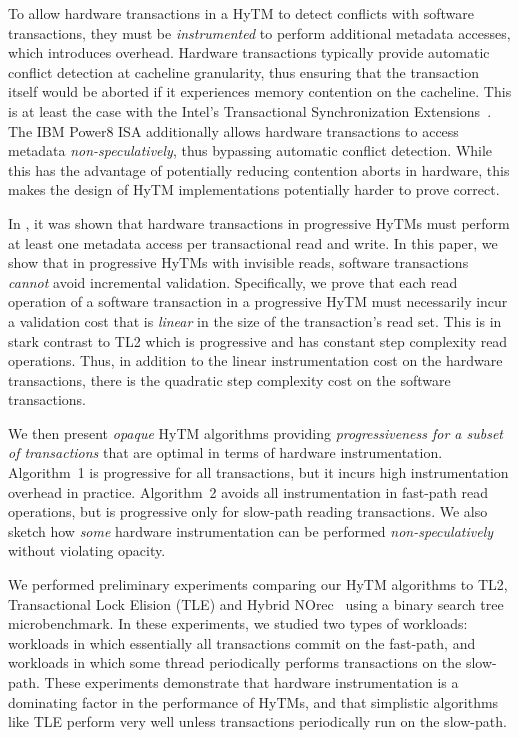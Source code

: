 To allow hardware transactions in a HyTM to detect conflicts with software transactions, they must be \emph{instrumented} to perform additional metadata accesses, which introduces overhead.
Hardware transactions typically provide automatic conflict detection at cacheline granularity,
thus ensuring that the transaction itself would be aborted if it experiences memory contention on the cacheline.
This is at least the case with the Intel's Transactional Synchronization Extensions~\cite{haswell}.
The IBM Power8 ISA additionally allows hardware transactions to access metadata \emph{non-speculatively}, 
thus bypassing automatic conflict detection. While this has the advantage of potentially reducing contention aborts
in hardware, this makes the design of HyTM implementations potentially harder to prove correct.

In \cite{htmdisc15}, it was shown that hardware transactions in progressive HyTMs must perform
at least one metadata access per transactional read and write.
In this paper, we show that in progressive HyTMs with invisible reads, 
software transactions \textit{cannot} avoid incremental validation.
Specifically, we prove that each read operation of a software transaction in a progressive HyTM
must necessarily incur a validation cost that is \emph{linear} 
in the size of the transaction's read set. 
This is in stark contrast to TL2 which is progressive and has constant step complexity read operations.
Thus, in addition to the linear instrumentation cost on the hardware transactions, there is the quadratic
step complexity cost on the software transactions.

We then present \emph{opaque} HyTM algorithms providing \emph{progressiveness for a subset of transactions} that are  %
optimal in terms of hardware instrumentation.
Algorithm~1 is progressive for all transactions, but it incurs high instrumentation overhead in practice.
Algorithm~2 avoids all instrumentation in fast-path read operations, but is progressive only for slow-path reading transactions.
We also sketch how \emph{some} hardware instrumentation can be performed \textit{non-speculatively} without violating opacity.

We performed preliminary experiments comparing our HyTM algorithms to TL2, Transactional Lock Elision (TLE) and Hybrid NOrec~\cite{hynorecriegel} using a binary search tree microbenchmark.
In these experiments, we studied two types of workloads: workloads in which essentially all transactions commit on the fast-path, and workloads in which some thread periodically performs transactions on the slow-path.
These experiments demonstrate that hardware instrumentation is a dominating factor in the performance of HyTMs, and that simplistic algorithms like TLE perform very well unless transactions periodically run on the slow-path.

